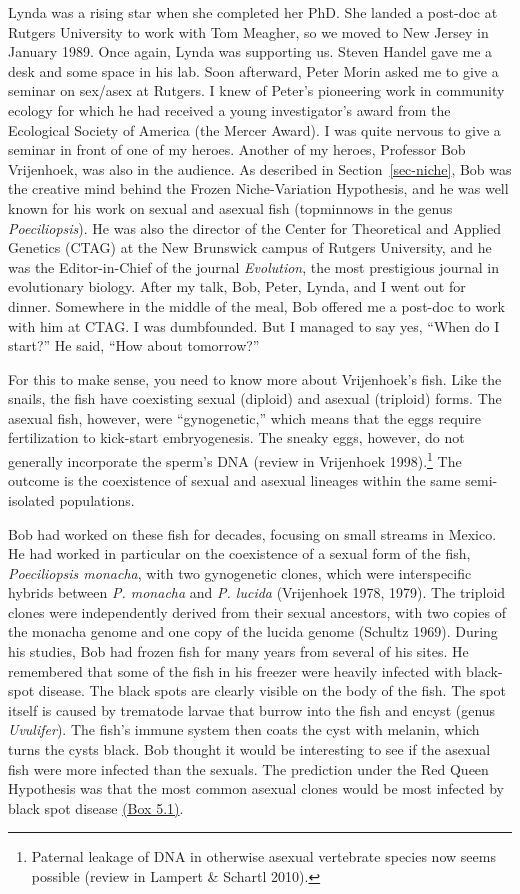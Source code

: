 \documentclass[
  letterpaper,
]{book}
\begin{document}
Lynda was a rising star when she completed her PhD. She landed a
post-doc at Rutgers University to work with Tom Meagher, so we moved to
New Jersey in January 1989. Once again, Lynda was supporting us. Steven
Handel gave me a desk and some space in his lab. Soon afterward, Peter
Morin asked me to give a seminar on sex/asex at Rutgers. I knew of
Peter's pioneering work in community ecology for which he had received a
young investigator's award from the Ecological Society of America (the
Mercer Award). I was quite nervous to give a seminar in front of one of
my heroes. Another of my heroes, Professor Bob Vrijenhoek, was also in
the audience. As described in Section~\ref{sec-niche}, Bob was the
creative mind behind the Frozen Niche-Variation Hypothesis, and he was
well known for his work on sexual and asexual fish (topminnows in the
genus \emph{Poeciliopsis}). He was also the director of the Center for
Theoretical and Applied Genetics (CTAG) at the New Brunswick campus of
Rutgers University, and he was the Editor-in-Chief of the journal
\emph{Evolution}, the most prestigious journal in evolutionary biology.
After my talk, Bob, Peter, Lynda, and I went out for dinner. Somewhere
in the middle of the meal, Bob offered me a post-doc to work with him at
CTAG. I was dumbfounded. But I managed to say yes, ``When do I start?''
He said, ``How about tomorrow?''

For this to make sense, you need to know more about Vrijenhoek's fish.
Like the snails, the fish have coexisting sexual (diploid) and asexual
(triploid) forms. The asexual fish, however, were ``gynogenetic,'' which
means that the eggs require fertilization to kick-start embryogenesis.
The sneaky eggs, however, do not generally incorporate the sperm's DNA
(review in Vrijenhoek 1998).\footnote{Paternal leakage of DNA in
  otherwise asexual vertebrate species now seems possible (review in
  Lampert \& Schartl 2010).} The outcome is the coexistence of sexual
and asexual lineages within the same semi-isolated populations.

Bob had worked on these fish for decades, focusing on small streams in
Mexico. He had worked in particular on the coexistence of a sexual form
of the fish, \emph{Poeciliopsis monacha}, with two gynogenetic clones,
which were interspecific hybrids between \emph{P. monacha} and \emph{P.
lucida} (Vrijenhoek 1978, 1979). The triploid clones were independently
derived from their sexual ancestors, with two copies of the monacha
genome and one copy of the lucida genome (Schultz 1969). During his
studies, Bob had frozen fish for many years from several of his sites.
He remembered that some of the fish in his freezer were heavily infected
with black-spot disease. The black spots are clearly visible on the body
of the fish. The spot itself is caused by trematode larvae that burrow
into the fish and encyst (genus \emph{Uvulifer}). The fish's immune
system then coats the cyst with melanin, which turns the cysts black.
Bob thought it would be interesting to see if the asexual fish were more
infected than the sexuals. The prediction under the Red Queen Hypothesis
was that the most common asexual clones would be most infected by black
spot disease \hyperref[callout-5]{(Box 5.1)}.
\end{document}
